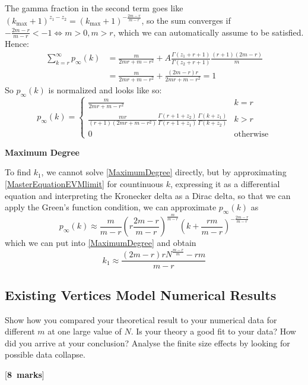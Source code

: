 \documentclass[a4paper,12pt]{article}
\newcounter{nmarks}
\newcommand{\qmarks}[1]{\addtocounter{nmarks}{#1} }
\renewcommand{\qmarks}[1]{\addtocounter{nmarks}{#1} \hspace*{\fill} [\textbf{#1~marks}]}
\begin{document}
The gamma fraction in the second term goes like $(k_{\mathrm{max}}+1)^{z_1-z_2}=(k_{\mathrm{max}}+1)^{-\frac{2m-r}{m-r}}$, so the sum converges if $-\frac{2m-r}{m-r}<-1\Leftrightarrow m>0,m>r$, which we can automatically assume to be satisfied. Hence:
\begin{align*}
\sum_{k=r}^\infty p_\infty(k) &= \frac{m}{2mr+m-r^2} + A\frac{\Gamma(z_1+r+1)}{\Gamma(z_2+r+1)}\frac{(r+1)(2m-r)}{m}\\
&= \frac{m}{2mr+m-r^2} + \frac{(2m-r)r}{2mr+m-r^2} = 1
\end{align*}
So $p_\infty(k)$ is normalized and looks like so:
\begin{equation} \label{RAPAprob}
p_\infty(k) = \begin{cases}
\frac{m}{2mr+m-r^2} & k=r\\
\frac{mr}{(r+1)(2mr+m-r^2)}\frac{\Gamma(r+1+z_2)}{\Gamma(r+1+z_1)}\frac{\Gamma(k+z_1)}{\Gamma(k+z_2)} & k>r\\
0 & \mathrm{otherwise}
\end{cases}
\end{equation}

\textbf{Maximum Degree}

To find $k_1$, we cannot solve \ref{MaximumDegree} directly, but by approximating \ref{MasterEquationEVMlimit} for countinuous $k$, expressing it as a differential equation and interpreting the Kronecker delta as a Dirac delta, so that we can apply the Green's function condition, we can approximate $p_\infty(k)$ as
\begin{equation*}
p_\infty(k)\approx \frac{m}{m-r}\left(r\frac{2m-r}{m-r}\right)^{\frac{m}{m-r}}\left(k+\frac{rm}{m-r}\right)^{-\frac{2m-r}{m-r}}
\end{equation*}
which we can put into \ref{MaximumDegree} and obtain
\begin{equation} \label{MaximumDegreeEVM}
k_1\approx \frac{(2m-r)rN^{\frac{m-r}{m}}-rm}{m-r}
\end{equation}

\subsection{Existing Vertices Model Numerical Results}

Show how you compared your theoretical result to your numerical data for different $m$ at one large value of $N$.  Is your theory a good fit to your data? How did you arrive at your conclusion?  
Analyse the finite size effects by looking for possible data collapse. 
\qmarks{8}
\end{document}
